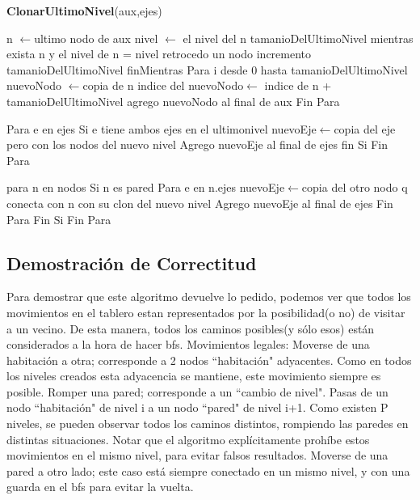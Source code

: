 \documentclass[spanish,12pt]{article}
\begin{document}
\begin{algorithm}[H]{\textbf{ClonarUltimoNivel}(aux,ejes)}
	\begin{algorithmic}[1]
		\State \quad n $\gets$ultimo nodo  de aux
		\State \quad nivel $\gets$ el nivel del n
		\State \quad tamanioDelUltimoNivel
		\State \quad mientras exista n  y el nivel de n = nivel
			\State \quad \quad retrocedo un nodo
			\State \quad \quad incremento tamanioDelUltimoNivel
		\State \quad finMientras
		\State \quad Para i desde 0 hasta tamanioDelUltimoNivel
		  	\State \quad \quad nuevoNodo $\gets$copia de n
			\State \quad \quad indice del nuevoNodo$\gets$ indice de n + tamanioDelUltimoNivel
			\State \quad \quad agrego nuevoNodo al final de aux
		\State \quad Fin Para

		\State \quad Para e en ejes
		 	\State \quad \quad Si e tiene ambos ejes en el ultimonivel
		 		\State \quad \quad \quad nuevoEje$\gets$copia del eje pero con los nodos del nuevo nivel
		  		\State \quad \quad \quad  Agrego nuevoEje al final de ejes
		 	\State \quad \quad fin Si
		\State \quad Fin Para

		\State \quad para n en nodos
		  	\State \quad \quad  Si n es pared
				\State \quad \quad \quad Para e en n.ejes
					\State \quad \quad \quad \quad  nuevoEje$\gets$copia del otro nodo q conecta con n con su clon del nuevo nivel
					\State \quad \quad \quad \quad Agrego nuevoEje al final de ejes
				\State \quad \quad \quad Fin Para
			\State \quad \quad Fin Si
		\State \quad Fin Para
	\end{algorithmic}
\end{algorithm}



\subsection{Demostración de Correctitud}
Para demostrar que este algoritmo devuelve lo pedido, podemos ver que todos los movimientos en el tablero estan representados por la posibilidad(o no) de visitar a un vecino. De esta manera, todos los caminos posibles(y sólo esos) están considerados a la hora de hacer bfs.
Movimientos legales:
Moverse de una habitación a otra; corresponde a 2 nodos ``habitación" adyacentes. Como en todos los niveles creados esta adyacencia se mantiene, este movimiento siempre es posible.
Romper una pared; corresponde a un ``cambio de nivel". Pasas de un nodo ``habitación" de nivel i a un nodo ``pared" de nivel i+1. Como existen P niveles, se pueden observar todos los caminos distintos, rompiendo las paredes en distintas situaciones. Notar que el algoritmo explícitamente prohíbe estos movimientos en el mismo nivel, para evitar falsos resultados.
Moverse de una pared a otro lado; este caso está siempre conectado en un mismo nivel, y con una guarda en el bfs para evitar la vuelta.
\end{document}
